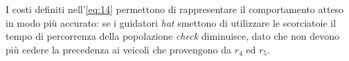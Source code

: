 I costi definiti nell'\autoref{eq:14} permettono di rappresentare il comportamento atteso in modo più accurato: se i guidatori \textit{hat} smettono
di utilizzare le scorciatoie il tempo di percorrenza della popolazione \textit{check} diminuisce, dato che non devono più cedere la precedenza ai veicoli che
provengono da $r_4$ ed $r_5$.